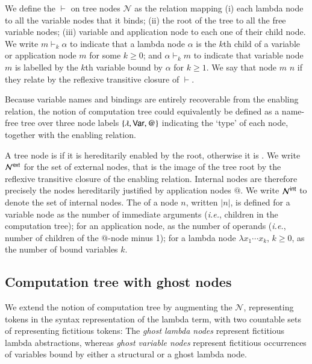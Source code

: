 \documentclass{elsarticle}
\makeatletter
\theoremstyle{plain}
\theoremstyle{definition}
\theoremstyle{remark}
\newcommand\Nodes{\mathcal{N}}%
\newcommand{\enables}{\vdash} %
\newcommand{\ExtNodes}{\Nodes^{\sf ext}}
\newcommand{\IntNodes}{\Nodes^{\sf int}}
\renewcommand\ie{{\it i.e.\@\xspace}}
\makeatother
\begin{document}
We define the  $\enables$ on tree nodes $\Nodes$ as the relation mapping (i) each lambda node to all the variable nodes that it binds; (ii) the root of the tree to all the free variable nodes; (iii) variable and application node to each one of their child node. We write $m \enables_k \alpha$ to indicate that a lambda node $\alpha$ is the $k$th child of a variable or application node $m$ for some $k\geq0$; and $\alpha \enables_k m$ to indicate that variable node $m$ is labelled by the $k$th variable bound by $\alpha$ for $k\geq1$.
We say that node $m$  $n$ if they relate by the reflexive transitive closure of $\enables$.

Because variable names and bindings are entirely recoverable from the enabling relation, the notion of computation tree could equivalently be defined as a name-free tree over three node labels $\{ \lambda, {\sf Var}, @ \}$ indicating the `type' of each node, together with the enabling relation.

A tree node is  if it is hereditarily enabled by the root, otherwise it is . We write $\ExtNodes$ for the set of external nodes, that is the image of the tree root by the reflexive transitive closure of the enabling relation. Internal nodes are therefore precisely the nodes hereditarily justified by application nodes $@$. We write $\IntNodes$ to denote the set of internal nodes.
The  of a node $n$, written $|n|$,
is defined for a variable node as the number of immediate arguments (\ie, children in the computation tree); for an application node, as the number of operands (\ie, number of children of the $@$-node minus 1); for a lambda node $\lambda x_1 \cdots x_k$, $k\geq 0$, as the number of bound variables $k$.

\subsection{Computation tree with ghost nodes}
We extend the notion of computation tree by augmenting the
  $\Nodes$, representing tokens in the syntax representation of the lambda term,
with two countable sets of  representing fictitious tokens: The \emph{ghost lambda nodes}
represent fictitious lambda abstractions,
whereas \emph{ghost variable nodes} represent fictitious
occurrences of variables bound by either a structural or a ghost lambda node.
\end{document}
